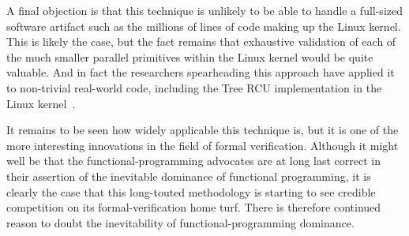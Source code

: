 A final objection is that this technique is unlikely to be able to handle
a full-sized software artifact such as the millions of lines of code making
up the Linux kernel.
This is likely the case, but the fact remains that exhaustive validation
of each of the much smaller parallel primitives within the Linux kernel
would be quite valuable.
And in fact the researchers spearheading this approach have applied it
to non-trivial real-world code, including the Tree RCU implementation in
the Linux
kernel~\cite{LihaoLiang2016VerifyTreeRCU,MichalisKokologiannakis2017NidhuggRCU}.

It remains to be seen how widely applicable this technique is, but
it is one of the more interesting innovations in the field of
formal verification.
Although it might well be that the functional-programming advocates
are at long last correct in their assertion of the inevitable
dominance of functional programming, it is clearly the case
that this long-touted methodology is starting to see credible
competition on its formal-verification home turf.
There is therefore continued reason to doubt the inevitability of
functional-programming dominance.
